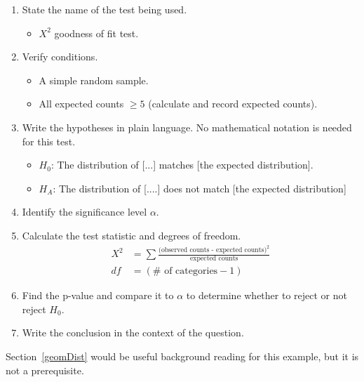 \begin{termBox}{
\begin{enumerate}
\setlength{\itemsep}{0mm}
\item State the name of the test being used.\vspace{-1.5mm}
\begin{itemize}
\setlength{\itemsep}{0mm}
\item $X^2$ goodness of fit test.
\end{itemize}
\item Verify conditions.\vspace{-1.5mm}
\begin{itemize}
\setlength{\itemsep}{0mm}
\item A simple random sample.
\item All expected counts $\ge 5$ (calculate and record expected counts).
\end{itemize}
\item Write the hypotheses in plain language. No mathematical notation is needed for this test.\vspace{-1.5mm}
\begin{itemize}
\setlength{\itemsep}{0mm}
\item $H_0$: The distribution of [...] matches [the expected distribution].
\item $H_A$: The distribution of [....] does not match [the expected distribution]
\end{itemize}
\item Identify the significance level $\alpha$.
\item Calculate the test statistic and degrees of freedom.\vspace{-2mm}
\begin{align*}
X^2 &= \sum{\frac{\text{(observed counts - expected counts)}^2}{\text{expected counts}}} \\
df &= (\# \text{ of categories} - 1)
\end{align*}
\item Find the p-value and compare it to $\alpha$ to determine whether to reject or not reject $H_0$.
\item Write the conclusion in the context of the question.
\end{enumerate}}
\end{termBox}

Section~\ref{geomDist} would be useful background reading for this example, but it is not a prerequisite.

